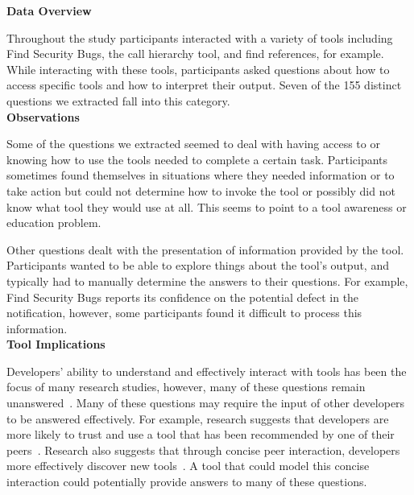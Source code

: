 \documentclass[conference]{IEEEtran}
\begin{document}
\noindent\textbf{Data Overview}

Throughout the study participants interacted with a variety of tools including Find Security Bugs, the call hierarchy tool, and find references, for example. 
While interacting with these tools, participants asked questions about how to access specific tools and how to interpret their output. 
Seven of the 155 distinct questions we extracted fall into this category.
\\

\noindent\textbf{Observations}

Some of the questions we extracted seemed to deal with having access to or knowing how to use the tools needed to complete a certain task. 
Participants sometimes found themselves in situations where they needed information or to take action but could not determine how to invoke the tool or possibly did not know what tool they would use at all. 
This seems to point to a tool awareness or education problem.

Other questions dealt with the presentation of information provided by the tool. 
Participants wanted to be able to explore things about the tool's output, and typically had to manually determine the answers to their questions. 
For example, Find Security Bugs reports its confidence on the potential defect in the notification, however, some participants found it difficult to process this information.
\\


\noindent\textbf{Tool Implications}

Developers' ability to understand and effectively interact with tools has been the focus of many research studies, however, many of these questions remain unanswered~\cite{ko2004designing, khoo2008path, johnson2013don}. 
Many of these questions may require the input of other developers to be answered effectively. 
For example, research suggests that developers are more likely to trust and use a tool that has been recommended by one of their peers~\cite{murphy2010trust}.
Research also suggests that through concise peer interaction, developers more effectively discover new tools~\cite{murphy2011peer}. 
A tool that could model this concise interaction could potentially provide answers to many of these questions.

\end{document}
